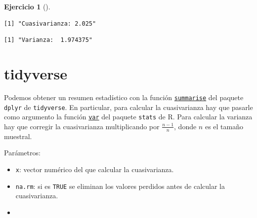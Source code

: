 \documentclass[
  spanish,
  a4paper,
]{scrreport}
\newenvironment{Shaded}{\begin{snugshade}}{\end{snugshade}}
\newcommand{\CommentTok}[1]{\textcolor[rgb]{0.37,0.37,0.37}{#1}}
\newcommand{\DecValTok}[1]{\textcolor[rgb]{0.68,0.00,0.00}{#1}}
\newcommand{\FunctionTok}[1]{\textcolor[rgb]{0.28,0.35,0.67}{#1}}
\newcommand{\NormalTok}[1]{\textcolor[rgb]{0.00,0.23,0.31}{#1}}
\newcommand{\OtherTok}[1]{\textcolor[rgb]{0.00,0.23,0.31}{#1}}
\newcommand{\SpecialCharTok}[1]{\textcolor[rgb]{0.37,0.37,0.37}{#1}}
\newcommand{\StringTok}[1]{\textcolor[rgb]{0.13,0.47,0.30}{#1}}
\providecommand{\tightlist}{%
  \setlength{\itemsep}{0pt}\setlength{\parskip}{0pt}}
\theoremstyle{definition}
\newtheorem{exercise}{Ejercicio}[chapter]
\theoremstyle{remark}
\begin{document}
\begin{exercise}[]
\begin{enumerate}
\begin{tcolorbox}
\begin{Shaded}
\end{Shaded}

\begin{verbatim}
[1] "Cuasivarianza: 2.025"
\end{verbatim}

\begin{Shaded}
\end{Shaded}

\begin{verbatim}
[1] "Varianza:  1.974375"
\end{verbatim}

  \section{tidyverse}

  Podemos obtener un resumen estadístico con la función
  \href{https://dplyr.tidyverse.org/reference/summarise.html}{\texttt{summarise}}
  del paquete \texttt{dplyr} de \texttt{tidyverse}. En particular, para
  calcular la cuasivarianza hay que pasarle como argumento la función
  \href{https://www.rdocumentation.org/packages/stats/versions/3.6.2/topics/cor}{\texttt{var}}
  del paquete \texttt{stats} de R. Para calcular la varianza hay que
  corregir la cuasivarianza multiplicando por \(\frac{n-1}{n}\), donde
  \(n\) es el tamaño muestral.

  Parámetros:

  \begin{itemize}
  \tightlist
  \item
    \texttt{x}: vector numérico del que calcular la cuasivarianza.
  \item
    \texttt{na.rm}: si es \texttt{TRUE} se eliminan los valores perdidos
    antes de calcular la cuasivarianza.
  \item
  \end{itemize}


\end{tcolorbox}
\end{enumerate}
\end{exercise}
\end{document}

